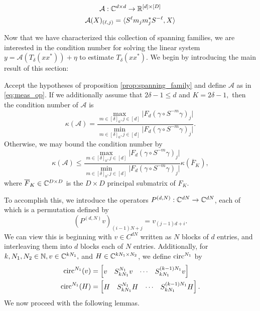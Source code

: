 \begin{gather} \mathcal{A} : \mathbb{C}^{d \times d} \to \mathbb{R}^{[d] \times [D]} \nonumber \\ \mathcal{A}(X)_{(\ell, j)} = \langle S^{\ell} m_j m_j^* S^{-\ell}, X \rangle \label{eq:meas_op} \end{gather}

Now that we have characterized this collection of spanning families, we are interested in the condition number for solving the linear system $y = \mathcal{A}(T_{\delta}(xx^*)) + \eta$ to estimate $T_\delta(xx^*)$.  We begin by introducing the main result of this section:

\begin{proposition}
  Accept the hypotheses of proposition \ref{prop:spanning_family} and define $\mathcal{A}$ as in \eqref{eq:meas_op}.  If we additionally assume that $2 \delta - 1 \le d$ and $K = 2 \delta - 1,$ then the condition number of $\mathcal{A}$ is \begin{equation}\kappa(\mathcal{A}) = \dfrac{\max\limits_{m \in [\delta]_0, j \in [d]} \lvert F_d (\gamma \circ S^{-m} \gamma)_j \rvert}{\min\limits_{m \in [\delta]_0, j \in [d]} \lvert F_d (\gamma \circ S^{-m} \gamma)_j \rvert}.\label{eq:clean_cond}\end{equation}  Otherwise, we may bound the condition number by \begin{equation}\kappa(\mathcal{A}) \le \dfrac{\max\limits_{m \in [\delta]_0, j \in [d]} \lvert F_d (\gamma \circ S^{-m} \gamma)_j \rvert}{\min\limits_{m \in [\delta]_0, j \in [d]} \lvert F_d (\gamma \circ S^{-m} \gamma)_j \rvert} \kappa(\overline{F}_K), \label{eq:messy_cond}\end{equation} where $\overline{F}_K \in \mathbb{C}^{D \times D}$ is the $D \times D$ principal submatrix of $F_K$.
\label{prop:span_fam_cond}
\end{proposition}

To accomplish this, we introduce the operators $P^{(d, N)} : \mathbb{C}^{dN} \to \mathbb{C}^{dN}$, each of which is a permutation defined by \[(P^{(d, N)} v)_{(i - 1)N + j} = v_{(j - 1)d + i}.\]  We can view this is beginning with $v \in C^{dN}$ written as $N$ blocks of $d$ entries, and interleaving them into $d$ blocks each of $N$ entries.  Additionally, for $k, N_1, N_2 \in \mathbb{N}, v \in \mathbb{C}^{kN_1},$ and $H \in \mathbb{C}^{kN_1 \times N_2}$, we define $\operatorname{circ}^{N_1}$ by \begin{align*} \operatorname{circ}^{N_1}(v) &= \begin{bmatrix} v & S_{kN_1}^{N_1} v & \cdots & S_{kN_1}^{(k-1)N_1} v \end{bmatrix} \\ \operatorname{circ}^{N_1}(H) &= \begin{bmatrix} H & S_{k N_1}^{N_1} H & \cdots & S_{k N_1}^{(k-1) N_1}H \end{bmatrix}. \end{align*}  We now proceed with the following lemmas.

